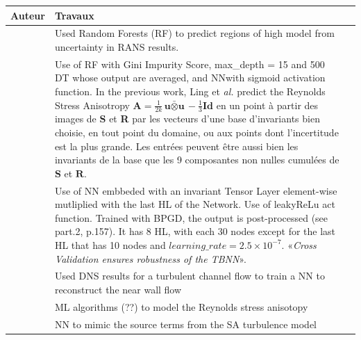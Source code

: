 \documentclass[a4paper,12pt]{report}
\newcommand\bk{\color{black}}
\newcommand\navy{\color{navy}}
\newcommand\red{\color{red}}
\numberwithin{equation}{section} %
\begin{document}
\begin{table}[!ht]
		\centering
		\begin{tabular}{|M{.2\textwidth}|M{.74\textwidth}|N }
		\hline
		Auteur & Travaux &\\[.5cm] \hline

		\textbf{\cite{ling2015evaluation}} & Used \red Random Forests (RF) \bk to \navy predict regions of high model from uncertainty in RANS results.\bk &\\[1.5cm] \hline

		\textbf{\cite{ling2016machine}} &Use of \red RF \bk with Gini Impurity Score, max\_depth = 15  and 500 DT whose output are averaged, and \red NN\bk with sigmoid activation function. In the previous work, Ling et \textit{al.} predict the Reynolds Stress Anisotropy $\textbf{A} = \frac{1}{2k} \bar{\textbf{u} \otimes \textbf{u}} - \frac{1}{3}\textbf{Id}$ en un point à partir des images de \textbf{S} et \textbf{R} par les vecteurs d'une base d'invariants bien choisie, en tout point du domaine, ou aux points dont l'incertitude est la plus grande. Les entrées peuvent être aussi bien les invariants de la base que les 9 composantes non nulles cumulées de $\textbf{S}$ et $\textbf{R}$.&\\[4.5cm] \hline		
		
		\textbf{\cite{ling2016reynolds}} & Use of \red NN \bk embbeded with an invariant Tensor Layer element-wise mutliplied with the last HL of the Network. Use of leakyReLu act function. Trained with BPGD, the output is post-processed (see part.2, p.157). It has 8 HL, with each 30 nodes except for the last HL that has 10 nodes and $learning\_rate = 2.5 \times 10^{-7}$. «\textit{Cross Validation ensures robustness of the TBNN}». &\\[3.5cm]\hline		
		
		\textbf{\cite{milano2002neural}} & Used DNS results for a turbulent channel flow to train a \red NN \bk to reconstruct the \navy near wall flow \bk&\\[1.5cm] \hline
		
		\textbf{\cite{tracey2013application}} & ML algorithms (\red??\bk) to model the \navy Reynolds stress anisotopy\bk  &\\[1.5cm] \hline
		
		\textbf{\cite{tracey2015machine}} & \red NN \bk to \navy mimic the source terms from the SA turbulence model \bk &\\[1.5cm] \hline
				

\end{tabular}
\end{table}
\end{document}
